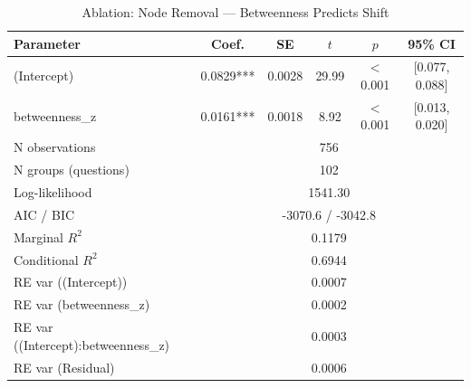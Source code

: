 \begin{table}[htbp]
\centering
\small
\caption{Ablation: Node Removal --- Betweenness Predicts Shift}
\label{tab:lme_ablation_node_betw_table}
\begin{tabular}{lccccc}
\toprule
Parameter & Coef. & SE & $t$ & $p$ & 95\% CI \\
\midrule
  (Intercept) & 0.0829*** & 0.0028 & 29.99 & $<$0.001 & [0.077, 0.088] \\
  betweenness\_z & 0.0161*** & 0.0018 & 8.92 & $<$0.001 & [0.013, 0.020] \\
\midrule
  N observations & \multicolumn{5}{c}{756} \\
  N groups (questions) & \multicolumn{5}{c}{102} \\
  Log-likelihood & \multicolumn{5}{c}{1541.30} \\
  AIC / BIC & \multicolumn{5}{c}{-3070.6 / -3042.8} \\
  Marginal $R^2$ & \multicolumn{5}{c}{0.1179} \\
  Conditional $R^2$ & \multicolumn{5}{c}{0.6944} \\
  RE var ((Intercept)) & \multicolumn{5}{c}{0.0007} \\
  RE var (betweenness\_z) & \multicolumn{5}{c}{0.0002} \\
  RE var ((Intercept):betweenness\_z) & \multicolumn{5}{c}{0.0003} \\
  RE var (Residual) & \multicolumn{5}{c}{0.0006} \\
\bottomrule
\end{tabular}
\end{table}
